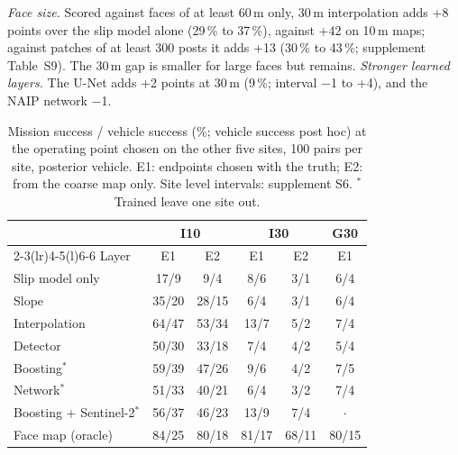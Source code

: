 \documentclass[conference]{IEEEtran}
\begin{document}
\textit{Face size.} Scored against faces of at least 60\,m only, 30\,m interpolation adds +8 points over the slip model alone (29\,\% to 37\,\%), against +42 on 10\,m maps; against patches of at least 300 posts it adds +13 (30\,\% to 43\,\%; supplement Table~S9). The 30\,m gap is smaller for large faces but remains. \textit{Stronger learned layers.} The U-Net adds +2 points at 30\,m (9\,\%; interval $-$1 to +4), and the NAIP network $-$1.


\begin{table}[t]
\caption{Mission success / vehicle success (\%; vehicle success post hoc) at the operating point chosen on the other five sites, 100 pairs per site, posterior vehicle. E1: endpoints chosen with the truth; E2: from the coarse map only. Site level intervals: supplement S6. $^{*}$Trained leave one site out.}
\label{tab:planning}
\centering\scriptsize
\setlength{\tabcolsep}{2.6pt}
\begin{tabular}{@{}lccccc@{}}
\toprule
 & \multicolumn{2}{c}{I10} & \multicolumn{2}{c}{I30} & G30 \\
\cmidrule(lr){2-3}\cmidrule(lr){4-5}\cmidrule(l){6-6}
Layer & E1 & E2 & E1 & E2 & E1 \\
\midrule
Slip model only & 17/9 & 9/4 & 8/6 & 3/1 & 6/4 \\
Slope & 35/20 & 28/15 & 6/4 & 3/1 & 6/4 \\
Interpolation & 64/47 & 53/34 & 13/7 & 5/2 & 7/4 \\
Detector & 50/30 & 33/18 & 7/4 & 4/2 & 5/4 \\
Boosting$^{*}$ & 59/39 & 47/26 & 9/6 & 4/2 & 7/5 \\
Network$^{*}$ & 51/33 & 40/21 & 6/4 & 3/2 & 7/4 \\
Boosting + Sentinel-2$^{*}$ & 56/37 & 46/23 & 13/9 & 7/4 & $\cdot$ \\
Face map (oracle) & 84/25 & 80/18 & 81/17 & 68/11 & 80/15 \\
\bottomrule
\end{tabular}
\end{table}
\end{document}
